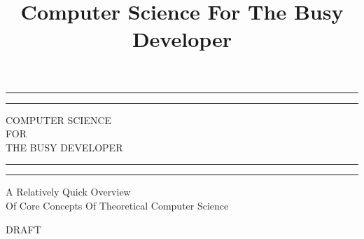 \documentclass[a4paper, justified, notitlepage, sfsidenotes, notoc]{tufte-book}
\date{}
\title{Computer Science For The Busy Developer}
\begin{document}
\begin{titlepage}
\begin{fullwidth} %

	\centering %

	\scshape %

	\vspace*{\baselineskip} %


	\rule{\textwidth}{1.6pt}\vspace*{-\baselineskip}\vspace*{2pt} %
	\rule{\textwidth}{0.4pt} %

	\vspace{0.75\baselineskip} %

	{\LARGE COMPUTER SCIENCE\\ FOR\\ THE BUSY DEVELOPER\\} %

	\vspace{0.75\baselineskip} %

	\rule{\textwidth}{0.4pt}\vspace*{-\baselineskip}\vspace{3.2pt} %
	\rule{\textwidth}{1.6pt} %

	\vspace{2\baselineskip} %


  A Relatively Quick Overview\\ Of Core Concepts Of Theoretical Computer Science

	\vspace*{3\baselineskip} %


	DRAFT

	\vspace{0.5\baselineskip} %


\end{fullwidth}
\end{titlepage}
\end{document}
